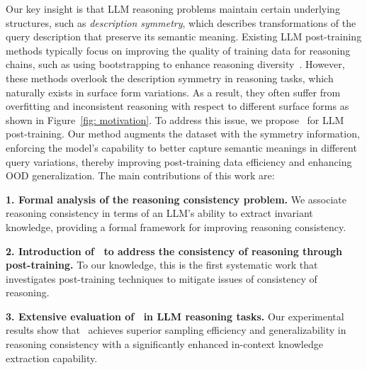 Our key insight is that LLM reasoning problems maintain certain underlying structures, such as \textit{description symmetry}, which describes transformations of the query description that preserve its semantic meaning. Existing LLM post-training methods typically focus on improving the quality of training data for reasoning chains, such as using bootstrapping to enhance reasoning diversity~\citep{yu2023metamath}. However, these methods overlook the description symmetry in reasoning tasks, which naturally exists in surface form variations. As a result, they often suffer from overfitting and inconsistent reasoning with respect to different surface forms as shown in Figure~\ref{fig: motivation}.  
To address this issue, we propose \methodlong\ for LLM post-training. Our method augments the dataset with the symmetry information, enforcing the model's capability to better capture semantic meanings in different query variations, thereby improving post-training data efficiency and enhancing OOD generalization.
The main contributions of this work are:


\textbf{1. Formal analysis of the reasoning consistency problem.} We associate reasoning consistency in terms of an LLM’s ability to extract invariant knowledge, providing a formal framework for improving reasoning consistency.

\textbf{2. Introduction of \method\ to address the consistency of reasoning through post-training.} To our knowledge, this is the first systematic work that investigates post-training techniques to mitigate issues of consistency of reasoning.

\textbf{3. Extensive evaluation of \method\ in LLM reasoning tasks.} Our experimental results show that \method\ achieves superior sampling efficiency and generalizability in reasoning consistency with a significantly enhanced in-context knowledge extraction capability.


